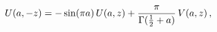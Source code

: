 \[\mathop{U\/}\nolimits\!\left(a,-z\right)=-\mathop{\sin\/}\nolimits(\pi a)%
\mathop{U\/}\nolimits\!\left(a,z\right)+\frac{\pi}{\mathop{\Gamma\/}\nolimits(%
\frac{1}{2}+a)}\mathop{V\/}\nolimits\!\left(a,z\right),\]